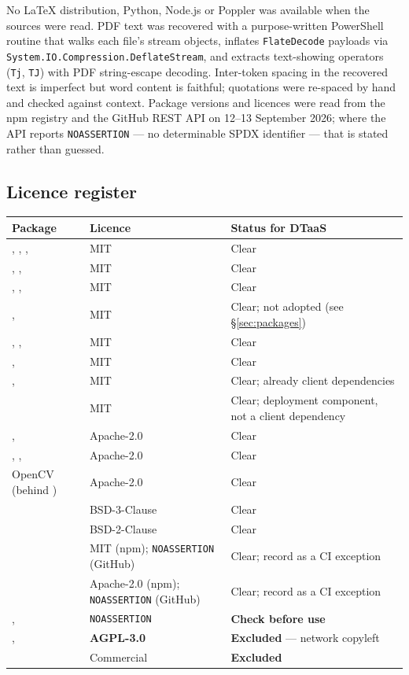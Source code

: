 No LaTeX distribution, Python, Node.js or Poppler was available when the sources were
read. PDF text was recovered with a purpose-written PowerShell routine that walks each
file's stream objects, inflates \texttt{FlateDecode} payloads via
\texttt{System.IO.Compression.DeflateStream}, and extracts text-showing operators
(\texttt{Tj}, \texttt{TJ}) with PDF string-escape decoding. Inter-token spacing in the
recovered text is imperfect but word content is faithful; quotations were re-spaced by
hand and checked against context. Package versions and licences were read from the npm
registry and the GitHub REST API on 12--13 September 2026; where the API reports
\texttt{NOASSERTION} --- no determinable SPDX identifier --- that is stated rather than
guessed.

\subsection{Licence register}

\begin{longtable}{@{}L{5.6cm}L{3.0cm}L{6.0cm}@{}}
\toprule
\textbf{Package} & \textbf{Licence} & \textbf{Status for DTaaS} \\
\midrule
\endhead
{}, , ,  & MIT & Clear \\
, ,  & MIT & Clear \\
, ,  & MIT & Clear \\
,  & MIT & Clear; not adopted (see
\S\ref{sec:packages}) \\
, ,  & MIT & Clear \\
,  & MIT & Clear \\
,  & MIT & Clear; already client dependencies \\
 & MIT & Clear; deployment component, not a client dependency \\
,  & Apache-2.0 & Clear \\
, ,  & Apache-2.0 & Clear \\
OpenCV (behind ) & Apache-2.0 & Clear \\
 & BSD-3-Clause & Clear \\
 & BSD-2-Clause & Clear \\
 & MIT (npm); \texttt{NOASSERTION} (GitHub) & Clear; record as a CI
exception \\
 & Apache-2.0 (npm); \texttt{NOASSERTION} (GitHub) & Clear; record as a CI
exception \\
,  & \texttt{NOASSERTION} & \textbf{Check before use} \\
,  & \textbf{AGPL-3.0} & \textbf{Excluded} ---
network copyleft \\
 & Commercial & \textbf{Excluded} \\
\bottomrule
\end{longtable}
